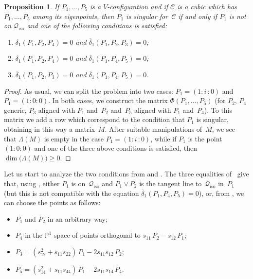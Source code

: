 \documentclass[a4paper, 11pt, reqno]{amsart}
\theoremstyle{plain}
\newtheorem{prop}[lemma]{Proposition}
\theoremstyle{definition}
\newcommand{\p}{\mathbb{P}}
\newcommand{\iii}{\textit{i}\,}
\newcommand{\iso}{\mathcal{Q}_{\mathrm{iso}}}
\begin{document}
\begin{prop}
\label{proposition:P1_sing}
If $P_1, \dots, P_5$ is a $V$-configuration and if
$\mathcal{C}$ is a cubic which
has $P_1, \dots, P_5$ among its eigenpoints, then $P_1$ is
singular for~$\mathcal{C}$ if
and only if $P_1$ is not on $\iso$ and one of the following conditions
is satisfied:
%
\begin{enumerate}
  \item $\delta_1(P_1, P_2, P_4) = 0$ and $\overline{\delta}_1(P_1, P_2, P_3) = 0$;
  \item $\delta_1(P_1, P_2, P_4) = 0$ and $\overline{\delta}_1(P_1, P_4, P_5) = 0$;
  \item $\overline{\delta}_1(P_1, P_2, P_3) = 0$ and
  $\overline{\delta}_1(P_1, P_4, P_5) = 0$.
\end{enumerate}
%
\end{prop}
\begin{proof}
As usual, we can split the problem into two cases: $P_1 = (1: \iii: 0)$
and $P_1 = (1: 0: 0)$. In both cases, we construct the matrix
$\Phi(P_1, \dots, P_5)$ (for $P_2$, $P_4$ generic, $P_3$ aligned with
$P_1$ and~$P_2$ and~$P_5$ aligned with $P_1$ and~$P_4$). To this matrix we add
a row which correspond to the condition that $P_1$ is singular, obtaining
in this way a matrix~$M$. After
suitable manipulations of~$M$, we see that $\Lambda(M)$ is empty
in the case $P_1=(1: \iii: 0)$, while if $P_1$ is the point~$(1:0:0)$
and one of the three above conditions is satisfied, then
$\dim \bigl( \Lambda(M) \bigr) \geq 0$.
\end{proof}

Let us start to analyze the two conditions from  and .
The three equalities of~ give that,
using , either $P_1$ is on~$\iso$ and
$P_1\vee P_2$ is the tangent line to~$\iso$ in~$P_1$ (but this is not compatible
with the equation $\overline{\delta}_1(P_1, P_4, P_5)=0$), or,
from , we can choose the points as follows:
%
\begin{itemize}
  \item $P_1$ and $P_2$ in an arbitrary way;
  \item $P_4$ in the $\p^1$
  space of points orthogonal to $s_{11} \, P_2 - s_{12} \, P_1$;
  \item $P_3 = (s_{12}^2+s_{11}s_{22}) \, P_1 - 2s_{11}s_{12} \, P_2$;
  \item $P_5 = (s_{14}^2+s_{11}s_{44}) \, P_1 - 2s_{11}s_{14} \, P_4$.
\end{itemize}
%
\end{document}
